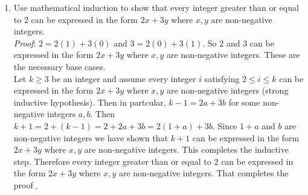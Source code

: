 \documentclass[12pt]{amsart}
\theoremstyle{definition}
\theoremstyle{remark}
\begin{document}
\begin{enumerate}




\newpage

\item Use mathematical induction to show that every integer greater than or equal to $2$ can be expressed in the form $2x+3y$ where $x,y$ are non-negative integers.\\


{\color{red}  \emph{Proof}: $2=2(1)+3(0)$ and $3=2(0)+3(1)$.  So $2$ and $3$ can be expressed in the form $2x+3y$ where $x,y$ are non-negative integers.  These are the necessary base cases.\\

Let $k\geq 3$ be an integer and assume every integer $i$ satisfying $2\leq i\leq k$ can be expressed in the form $2x+3y$ where $x,y$ are non-negative integers (strong inductive hypothesis).  Then in partcular, $k-1=2a+3b$ for some non-negative integers $a,b$.  Then $k+1=2+(k-1)=2+2a+3b=2(1+a)+3b$.  Since $1+a$ and $b$ are non-negative integers we have shown that $k+1$ can be expressed in the form $2x+3y$ where $x,y$ are non-negative integers.  This completes the inductive step.  Therefore every integer greater than or equal to $2$ can be expressed in the form $2x+3y$ where $x,y$ are non-negative integers.  That completes the proof$\;_{\square}$ }



\end{enumerate}
\end{document}
